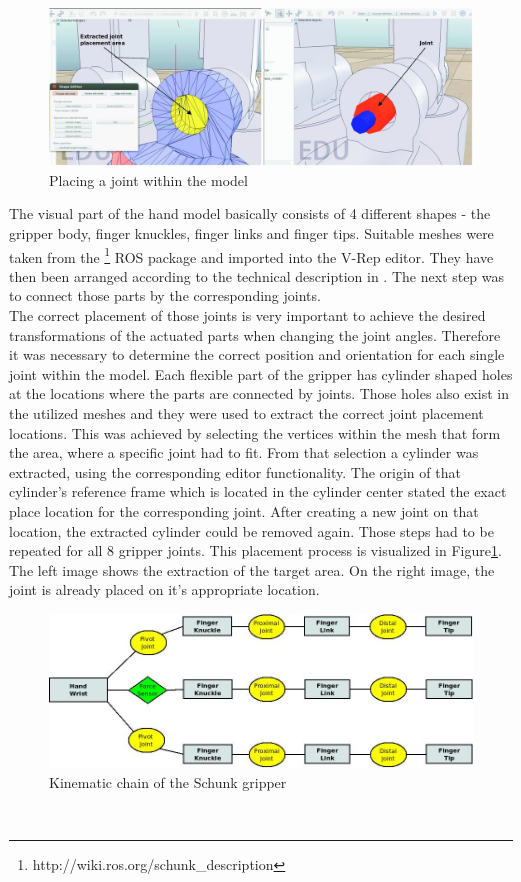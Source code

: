 \begin{figure}[t]
	\centering
  	\includegraphics[width=1.0\textwidth]{images/place_joint.jpg}
	\caption{Placing a joint within the model}
	\label{fig:place_jnt}
\end{figure}

The visual part of the hand model basically consists of 4 different shapes - the gripper body, finger knuckles, finger links and finger tips. Suitable meshes were taken from the \footnote{http://wiki.ros.org/schunk\_description} ROS package and imported into the V-Rep editor. They have then been arranged according to the technical description in \citep{schunk2010}. The next step was to connect those parts by the corresponding joints. \\

The correct placement of those joints is very important to achieve the desired transformations of the actuated parts when changing the joint angles. Therefore it was necessary to determine the correct position and orientation for each single joint within the model. Each flexible part of the gripper has cylinder shaped holes at the locations where the parts are connected by joints. Those holes also exist in the utilized meshes and they were used to extract the correct joint placement locations. This was achieved by selecting the vertices within the mesh that form the area, where a specific joint had to fit. From that selection a cylinder was extracted, using the corresponding editor functionality. The origin of that cylinder's reference frame which is located in the cylinder center stated the exact place location for the corresponding joint. After creating a new joint on that location, the extracted cylinder could be removed again. Those steps had to be repeated for all 8 gripper joints. This placement process is visualized in Figure\ref{fig:place_jnt}. The left image shows the extraction of the target area. On the right image, the joint is already placed on it's appropriate location.
\begin{figure}[h]
	\centering
  	\includegraphics[width=1.0\textwidth]{images/hand_tree.jpg}
	\caption{Kinematic chain of the Schunk gripper}
	\label{fig:hand_tree}
\end{figure}\\

